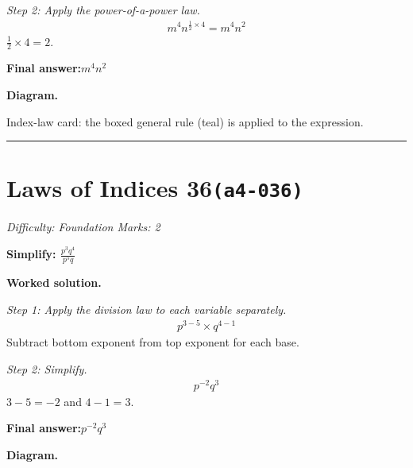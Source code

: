 \documentclass[11pt]{article}
\newcommand{\question}[1]{\par\medskip\noindent\textbf{#1}\par}
\begin{document}
\textit{Step 2: Apply the power-of-a-power law.}
\[\begin{gathered}
m^4 n^{\frac{1}{2} \times 4} = m^4 n^{2}
\end{gathered}\]
\( \frac{1}{2} \times 4 = 2 \).

\begin{answerbox}
\textbf{Final answer:}\quad \(\displaystyle m^4 n^{2}\)
\end{answerbox}
\textbf{Diagram.}

\begin{center}
\end{center}
\small Index-law card: the boxed general rule (teal) is applied to the expression.\normalsize

\medskip\hrule

\section*{Laws of Indices 36\quad\small\texttt{(a4-036)}}
\textit{Difficulty: Foundation \quad\textbar\quad Marks: 2}

\question{Simplify: \( \frac{p^3 q^4}{p^5 q} \)}

\textbf{Worked solution.}

\textit{Step 1: Apply the division law to each variable separately.}
\[\begin{gathered}
p^{3-5} \times q^{4-1}
\end{gathered}\]
Subtract bottom exponent from top exponent for each base.

\textit{Step 2: Simplify.}
\[\begin{gathered}
p^{-2} q^{3}
\end{gathered}\]
\( 3 - 5 = -2 \) and \( 4 - 1 = 3 \).

\begin{answerbox}
\textbf{Final answer:}\quad \(\displaystyle p^{-2} q^{3}\)
\end{answerbox}
\textbf{Diagram.}
\end{document}
